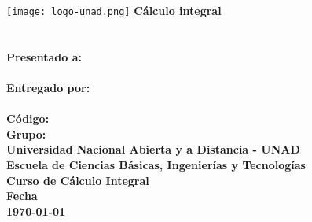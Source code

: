 




\begin{titlepage}
    \begin{center}
        \texttt{[image: logo-unad.png]}
        \textbf{Cálculo integral\\}
        \vspace*{1cm}
        \textbf{
            \\
            \\
        }
        \vspace*{1cm}
        \textbf{
            Presentado a:\\
            \tutorname\\
        }
        \vspace*{1cm}
        \textbf{Entregado por:\\}
        \vspace*{1cm}
        \textbf{
            \studentname\\
            Código: \idcode\\
            Grupo: \group\\
        }
        \vspace*{3cm}
        \textbf{
            Universidad Nacional Abierta y a Distancia - UNAD\\
            Escuela de Ciencias Básicas, Ingenierías y Tecnologías\\ 
            Curso de Cálculo Integral\\ 
            Fecha\\
            \today
        }
    \end{center}
\end{titlepage}